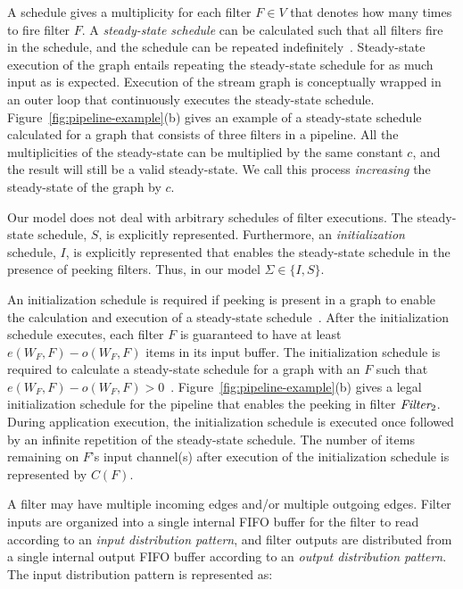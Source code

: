 A schedule gives a multiplicity for each filter $F \in V$ that denotes
how many times to fire filter $F$. A {\it steady-state schedule} can
be calculated such that all filters fire in the schedule, and the
schedule can be repeated indefinitely~\cite{lee87}.  Steady-state
execution of the graph entails repeating the steady-state schedule for
as much input as is expected.  Execution of the stream graph is
conceptually wrapped in an outer loop that continuously executes the
steady-state schedule.  Figure~\ref{fig:pipeline-example}(b) gives an
example of a steady-state schedule calculated for a graph that
consists of three filters in a pipeline.  All the multiplicities of
the steady-state can be multiplied by the same constant $c$, and the
result will still be a valid steady-state.  We call this process {\it
  increasing} the steady-state of the graph by $c$.

Our model does not deal with arbitrary schedules of filter executions.
The steady-state schedule, $S$, is explicitly represented.
Furthermore, an {\it initialization} schedule, $I$, is explicitly
represented that enables the steady-state schedule in the presence of
peeking filters.  Thus, in our model $\Sigma \in \{I, S\}$. 

An initialization schedule is required if peeking is present in a
graph to enable the calculation and execution of a steady-state
schedule~\cite{karczma-thesis}.  After the initialization schedule
executes, each filter $F$ is guaranteed to have at least $e(W_F, F) -
o(W_F, F)$ items in its input buffer. The initialization schedule is
required to calculate a steady-state schedule for a graph with an $F$
such that $e(W_F, F) - o(W_F, F) > 0$~\cite{karczmarek-lctes03}.
Figure~\ref{fig:pipeline-example}(b) gives a legal initialization
schedule for the pipeline that enables the peeking in filter
$\mbox{\it Filter}_2$.  During application execution, the initialization
schedule is executed once followed by an infinite repetition of the
steady-state schedule.   The number
of items remaining on $F$'s input channel(s) after execution of the
initialization schedule is represented by $C(F)$.  

A filter may have multiple incoming edges and/or multiple outgoing
edges.  Filter inputs are organized into a single internal FIFO buffer for the
filter to read according to an {\it input distribution pattern}, and
filter outputs are distributed from a single internal output FIFO
buffer according to an {\it output distribution pattern}.   
The input distribution pattern is represented as:

